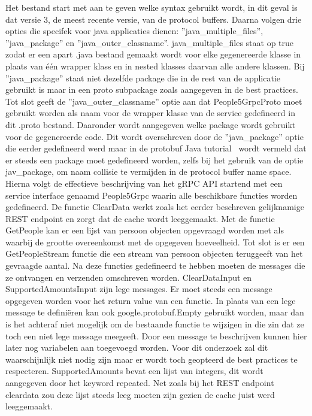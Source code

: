 Het bestand start met aan te geven welke syntax gebruikt wordt, in dit geval is dat versie 3, de meest recente versie, van de protocol buffers.
Daarna volgen drie opties die specifek voor java applicaties dienen: ''java\_multiple\_files'', ''java\_package'' en ''java\_outer\_classname''.
java\_multiple\_files staat op true zodat er een apart .java bestand gemaakt wordt voor elke gegenereerde klasse in plaats
van \'e\'en wrapper klass en in nested klasses daarvan alle andere klassen. Bij ''java\_package'' staat niet dezelfde package die in de rest van de applicatie gebruikt is
maar in een proto subpackage zoals aangegeven in de best practices.
Tot slot geeft de ''java\_outer\_classname'' optie aan dat People5GrpcProto moet gebruikt worden als naam voor de wrapper klasse van de service gedefineerd in dit .proto bestand.
Daaronder wordt aangegeven welke package wordt gebruikt voor de gegenereerde code. Dit wordt overschreven door de ''java\_package'' optie die eerder gedefineerd werd maar
in de protobuf Java tutorial~\parencite{protobufJava} wordt vermeld dat er steeds een package moet gedefineerd worden, zelfs bij het gebruik van de optie jav\_package, om naam collisie
te vermijden in de protocol buffer name space. Hierna volgt de effectieve beschrijving van het gRPC API startend met een service interface genaamd People5Grpc waarin
alle beschikbare functies worden gedefineerd. De functie ClearData werkt zoals het eerder beschreven gelijknamige REST endpoint en zorgt dat de cache wordt leeggemaakt.
Met de functie GetPeople kan er een lijst van persoon objecten opgevraagd worden met als waarbij de grootte overeenkomst met de opgegeven hoeveelheid.
Tot slot is er een GetPeopleStream functie die een stream van persoon objecten teruggeeft van het gevraagde aantal.
Na deze functies gedefineerd te hebben moeten de messages die ze ontvangen en verzenden omschreven worden.
ClearDataInput en SupportedAmountsInput zijn lege messages. Er moet steeds een message opgegeven worden voor het return value van een functie.
In plaats van een lege message te defini\"eren kan ook google.protobuf.Empty gebruikt worden, maar dan is het achteraf niet mogelijk om de bestaande functie
te wijzigen in die zin dat ze toch een niet lege message meegeeft. Door een message te beschrijven kunnen hier later nog variabelen aan toegevoegd worden.
Voor dit onderzoek zal dit waarschijnlijk niet nodig zijn maar er wordt toch geopteerd de best practices te respecteren.
SupportedAmounts bevat een lijst van integers, dit wordt aangegeven door het keyword repeated.
Net zoals bij het REST endpoint cleardata zou deze lijst steeds leeg moeten zijn gezien de cache juist werd leeggemaakt.
